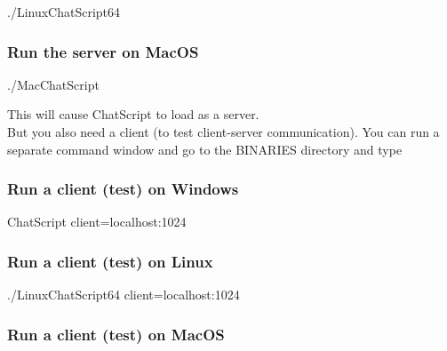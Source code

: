 \documentclass[]{article}
\newenvironment{Shaded}{}{}
\newcommand{\ExtensionTok}[1]{#1}
\newcommand{\NormalTok}[1]{#1}
\begin{document}
\begin{Shaded}
\begin{Highlighting}[]
\ExtensionTok{./LinuxChatScript64}
\end{Highlighting}
\end{Shaded}

\subsubsection{Run the server on MacOS}\label{run-the-server-on-macos}

\begin{Shaded}
\begin{Highlighting}[]
\ExtensionTok{./MacChatScript}
\end{Highlighting}
\end{Shaded}

This will cause ChatScript to load as a server.\\
But you also need a client (to test client-server communication). You
can run a separate command window and go to the BINARIES directory and
type

\subsubsection{Run a client (test) on
Windows}\label{run-a-client-test-on-windows}

\begin{Shaded}
\begin{Highlighting}[]
\ExtensionTok{ChatScript}\NormalTok{ client=localhost:1024 }
\end{Highlighting}
\end{Shaded}

\subsubsection{Run a client (test) on
Linux}\label{run-a-client-test-on-linux}

\begin{Shaded}
\begin{Highlighting}[]
\ExtensionTok{./LinuxChatScript64}\NormalTok{ client=localhost:1024}
\end{Highlighting}
\end{Shaded}

\subsubsection{Run a client (test) on
MacOS}\label{run-a-client-test-on-macos}
\end{document}
